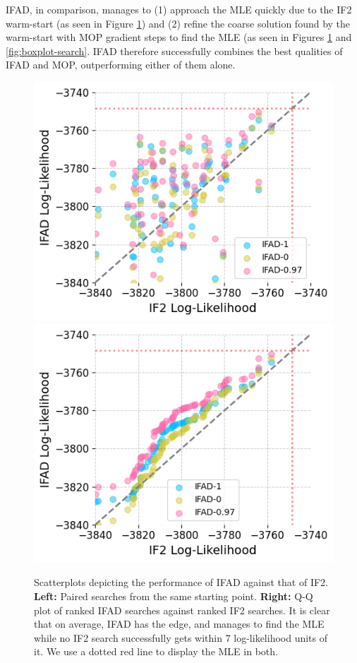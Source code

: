 \documentclass[9pt,twocolumn,twoside]{pnas-new}
\begin{document}
IFAD, in comparison, manages to (1) approach the MLE quickly due to the IF2 warm-start (as seen in Figure \ref{fig:scatter-optim}) and (2) refine the coarse solution found by the warm-start with MOP gradient steps to find the MLE (as seen in Figures \ref{fig:scatter-optim} and \ref{fig:boxplot-search}. IFAD therefore successfully combines the best qualities of IFAD and MOP, outperforming either of them alone. 


\begin{figure}[htbp!]
    \includegraphics[width=\textwidth/\real{4.2}]{../imgs/095/pairs.png}
    \includegraphics[width=\textwidth/\real{4.2}]{../imgs/095/qq.png}
    \caption{Scatterplots depicting the performance of IFAD against that of IF2. \textbf{Left:} Paired searches from the same starting point. \textbf{Right:} Q-Q plot of ranked IFAD searches against ranked IF2 searches. It is clear that on average, IFAD has the edge, and manages to find the MLE while no IF2 search successfully gets within 7 log-likelihood units of it. We use a dotted red line to display the MLE in both. }
    \label{fig:scatter-optim}
\end{figure}
\end{document}
